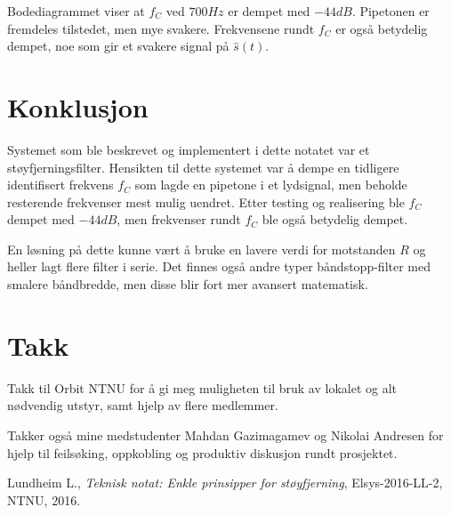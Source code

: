 \documentclass[a4paper,11pt,norsk]{article}
\begin{document}
Bodediagrammet viser at $f_C$ ved $700Hz$ er dempet med $-44dB$. Pipetonen er fremdeles tilstedet, men mye svakere. Frekvensene rundt $f_C$ er også betydelig dempet, noe som gir et svakere signal på $\hat{s}(t)$.


\section{Konklusjon}
\label{sec:konklusjon}

Systemet som ble beskrevet og implementert i dette notatet var et støyfjerningsfilter. Hensikten til dette systemet var å dempe en tidligere identifisert frekvens $f_C$ som lagde en pipetone i et lydsignal, men beholde resterende frekvenser mest mulig uendret. 
Etter testing og realisering ble $f_C$ dempet med $-44dB$, men frekvenser rundt $f_C$ ble også betydelig dempet. 

En løsning på dette kunne vært å bruke en lavere verdi for motstanden $R$ og heller lagt flere filter i serie. Det finnes også andre typer båndstopp-filter med smalere båndbredde, men disse blir fort mer avansert matematisk. 

\section{Takk}

Takk til Orbit NTNU for å gi meg muligheten til bruk av lokalet og alt nødvendig utstyr, samt hjelp av flere medlemmer. 

Takker også mine medstudenter Mahdan Gazimagamev og Nikolai Andresen for hjelp til feilsøking, oppkobling og produktiv diskusjon rundt prosjektet.

{}

\begin{thebibliography}{99}
        Lundheim L., 
        \textit{Teknisk notat: Enkle prinsipper for støyfjerning}, 
    	Elsys-2016-LL-2, 
    	NTNU,
    	2016.
    \end{thebibliography}
\end{document}
